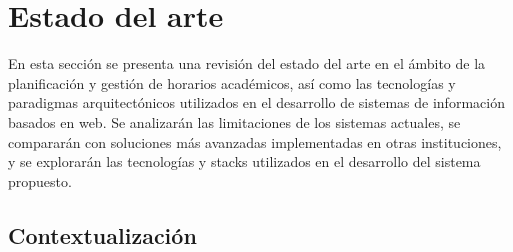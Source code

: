 \chapter{Estado del arte}\label{cap:estado}

En esta sección se presenta una revisión del estado del arte en el ámbito de la planificación y gestión de horarios académicos, así como las tecnologías y paradigmas arquitectónicos utilizados en el desarrollo de sistemas de información basados en web. Se analizarán las limitaciones de los sistemas actuales, se compararán con soluciones más avanzadas implementadas en otras instituciones, y se explorarán las tecnologías y stacks utilizados en el desarrollo del sistema propuesto.

\section{Contextualización}

